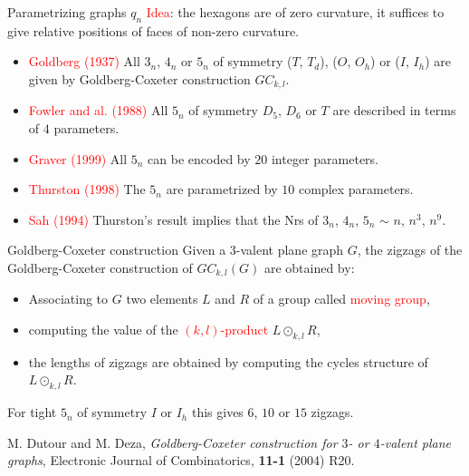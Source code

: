 \documentclass[%
pdf,
colorBG,
slideColor,
]{prosper}
\begin{document}
\begin{slide}{Parametrizing graphs $q_n$}
\textcolor{red}{Idea}: the hexagons are of zero curvature, it suffices to give relative positions of faces of non-zero curvature.
\begin{itemize}
\item \textcolor{red}{Goldberg (1937)} All $3_n$, $4_n$ or $5_n$ of symmetry ($T$, $T_d$), ($O$, $O_h$) or ($I$, $I_h$) are given by Goldberg-Coxeter construction $GC_{k,l}$.
\item \textcolor{red}{Fowler and al. (1988)} All $5_n$ of symmetry $D_5$, $D_6$ or $T$ are described in terms of $4$ parameters.
\item \textcolor{red}{Graver (1999)} All $5_n$ can be encoded by $20$ integer parameters.
\item \textcolor{red}{Thurston (1998)} The $5_n$ are parametrized by $10$ complex parameters.
\item \textcolor{red}{Sah (1994)} Thurston's result implies that the Nrs of $3_n$, $4_n$, $5_n$ $\sim$ $n$, $n^3$, $n^9$.
\end{itemize}




\end{slide}





\begin{slide}{Goldberg-Coxeter construction}
Given a $3$-valent plane graph $G$, the zigzags of the Goldberg-Coxeter construction of $GC_{k,l}(G)$ are obtained by:

\begin{itemize}
\item Associating to $G$ two elements $L$ and $R$ of a group called \textcolor{red}{moving group},
\item computing the value of the \textcolor{red}{$(k,l)$-product} $L\odot_{k,l} R$,
\item the lengths of zigzags are obtained by computing the cycles structure of $L\odot_{k,l} R$.
\end{itemize}
For tight $5_n$ of symmetry $I$ or $I_h$ this gives $6$, $10$ or $15$ zigzags.


{\scriptsize

M. Dutour and M. Deza, {\em Goldberg-Coxeter construction for $3$- or $4$-valent plane graphs}, Electronic Journal of Combinatorics, {\bf 11-1} (2004) R20.
}


\end{slide}
\end{document}
